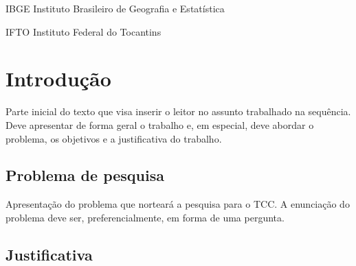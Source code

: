 \documentclass{unemat-tex}
\begin{document}
\listoftables*
\cleardoublepage

\begin{siglas}
	\item[IBGE]{Instituto Brasileiro de Geografia e Estatística}
	\item[IFTO]{Instituto Federal do Tocantins}
\end{siglas}


\tableofcontents*
\cleardoublepage


\textual

\chapter{Introdução}

	Parte inicial do texto que visa inserir o leitor no assunto trabalhado na sequência. Deve apresentar de forma geral o trabalho e, em especial, deve abordar o problema, os objetivos e a justificativa do trabalho.

	\section{Problema de pesquisa}
	
		Apresentação do problema que norteará a pesquisa para o TCC. A enunciação do problema deve ser,	preferencialmente, em forma de uma pergunta.
	
	\section{Justificativa}
	
\end{document}
